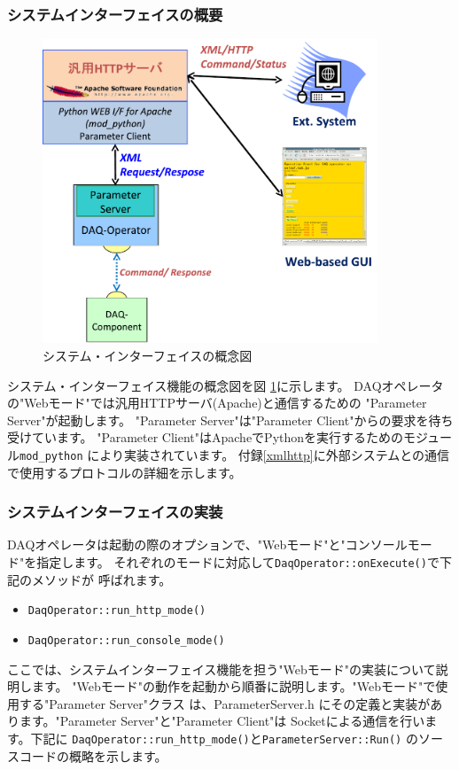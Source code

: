 \documentclass[a4j,10pt,dvips,onecolumn,oneside,final]{jarticle}%
\begin{document}
\subsubsection{システムインターフェイスの概要}\label{web-mode-overview}
\begin{figure}[htbp]
  \begin{center}
   \includegraphics[width=100mm]{web-interface.pdf}
  \end{center}
  \caption{システム・インターフェイスの概念図}
  \label{web-interface.fig}
\end{figure}

システム・インターフェイス機能の概念図を図 \ref{web-interface.fig}に示します。
DAQオペレータの"Webモード"では汎用HTTPサーバ(Apache)と通信するための
"Parameter Server"が起動します。
"Parameter Server"は"Parameter Client"からの要求を待ち受けています。
"Parameter Client"はApacheでPythonを実行するためのモジュール\verb|mod_python|
により実装されています。
付録\ref{xmlhttp}に外部システムとの通信で使用するプロトコルの詳細を示します。

\subsubsection{システムインターフェイスの実装}\label{web-mode-tech}
DAQオペレータは起動の際のオプションで、"Webモード"と"コンソールモード"を指定します。
それぞれのモードに対応して\verb|DaqOperator::onExecute()|で下記のメソッドが
呼ばれます。
\begin{itemize}
\item \verb|DaqOperator::run_http_mode()|
\item \verb|DaqOperator::run_console_mode()|
\end{itemize}
ここでは、システムインターフェイス機能を担う"Webモード"の実装について説明します。
"Webモード"の動作を起動から順番に説明します。"Webモード"で使用する"Parameter Server"クラス
は、ParameterServer.h にその定義と実装があります。"Parameter Server"と"Parameter Client"は
Socketによる通信を行います。下記に \verb|DaqOperator::run_http_mode()|と\verb|ParameterServer::Run()|
のソースコードの概略を示します。
\end{document}
